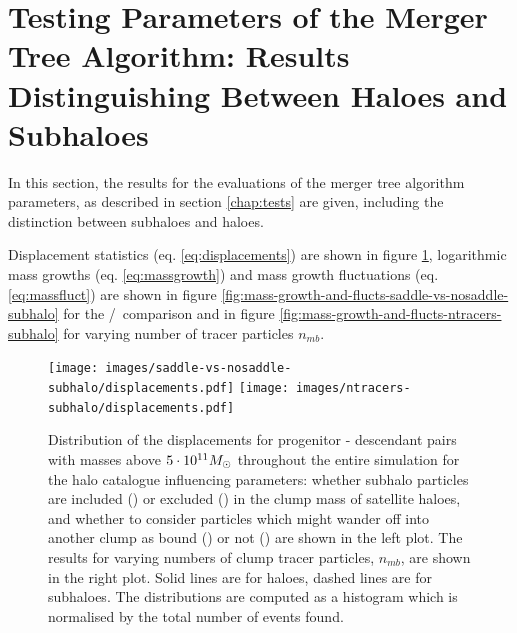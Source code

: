 \begin{appendices}
\begin{itemize}
\end{itemize}






















\section{Testing Parameters of the Merger Tree Algorithm: Results Distinguishing Between Haloes and Subhaloes }\label{app:halo-subhalo-mtree-evals}

In this section, the results for the evaluations of the merger tree algorithm parameters,  as described in section \ref{chap:tests} are given, including the distinction between subhaloes and haloes.

Displacement statistics (eq. \ref{eq:displacements}) are shown in figure \ref{fig:displacements-subhalo}, logarithmic mass growths (eq. \ref{eq:massgrowth}) and mass growth fluctuations (eq. \ref{eq:massfluct}) are shown in figure \ref{fig:mass-growth-and-flucts-saddle-vs-nosaddle-subhalo} for the \sad/\nosad\ comparison and in figure \ref{fig:mass-growth-and-flucts-ntracers-subhalo} for varying number of tracer particles $n_{mb}$.


\begin{figure}[H]
	\centering
		\centering
		\texttt{[image: images/saddle-vs-nosaddle-subhalo/displacements.pdf]}
	\endminipage%
	\hspace*{\fill}
		\centering
		\texttt{[image: images/ntracers-subhalo/displacements.pdf]}%
	\endminipage\hspace*{\fill} 
	\caption{
		Distribution of the displacements for progenitor - descendant pairs with masses above $5\cdot 10^{11}M_\odot$ throughout the entire simulation for the halo catalogue influencing parameters: 
		whether subhalo particles are included (\inc) or excluded (\exc) in the clump mass of satellite haloes, and whether to consider particles which might wander off into another clump as bound (\nosad) or not (\sad) are shown in the left plot.
		The results for varying numbers of clump tracer particles, $n_{mb}$, are shown in the right plot.
		Solid lines are for haloes, dashed lines are for subhaloes.
		The distributions are computed as a histogram which is normalised by the total number of events found.
	}%
	\label{fig:displacements-subhalo}
\end{figure}




\end{appendices}
